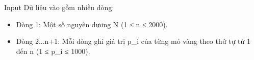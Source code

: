 Input
Dữ liệu vào gồm nhiều dòng:  
\begin{itemize}
	\item     Dòng 1: Một số nguyên dương N (1 ≤ n ≤ 2000).   
	\item     Dòng 2...n+1: Mỗi dòng ghi giá trị p\_i của từng mỏ vàng theo thứ tự từ 1 đến n (1 ≤ p\_i ≤ 1000).   
\end{itemize}